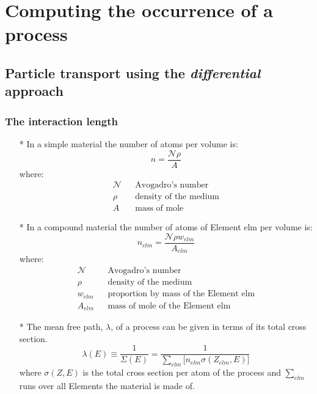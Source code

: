  \chapter[Computing the occurrence of a process]
   {Computing the occurrence of a process} 

\section{Particle transport using the {\em differential} approach}
\subsection{The interaction length}
\begin{itemize}
\item[*]
         In a simple material the number of atoms per volume is:
         \[n  = \frac{\mathcal{N}\rho}{A}\]
         where:
         \begin{eqnarray*}
          \mathcal{N} &  & \mbox{Avogadro's number} \\
          \rho        &  & \mbox{density of the medium} \\
          A           &  & \mbox{mass of mole} 
         \end{eqnarray*}
\item[*]
         In a compound material the number of atoms of Element elm per volume is:
         \[n_{elm}  = \frac{\mathcal{N}\rho w_{elm}}{A_{elm}}\]
         where:
         \begin{eqnarray*}
          \mathcal{N} &  & \mbox{Avogadro's number} \\
          \rho        &  & \mbox{density of the medium} \\
          w_{elm}     &  & \mbox{proportion by mass of the Element elm}\\
          A_{elm}     &  & \mbox{mass of mole of the Element elm} 
         \end{eqnarray*} 
\item[*] 
         The mean free path, $\lambda$, of a process can be given in terms of its 
 total cross section. 
         \[
           \lambda(E) \equiv \frac{1}{\Sigma (E)} 
             = \frac{1}{\sum_{elm}{\lbrack n_{elm} \sigma(Z_{elm},E)\rbrack}}
         \]
         where $\sigma(Z,E)$  is the total cross section per atom of the
         process and
          $\sum_{elm}$ runs over all Elements the material is made of.
\end{itemize}

